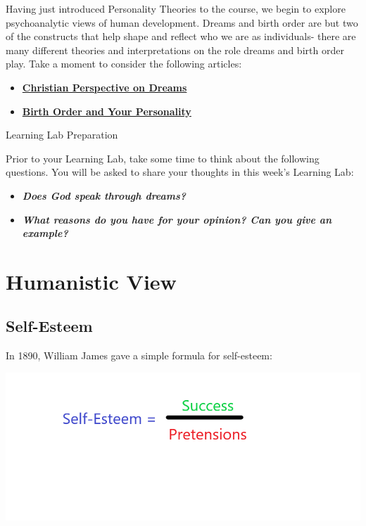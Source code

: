 \documentclass[
]{book}
\providecommand{\tightlist}{%
  \setlength{\itemsep}{0pt}\setlength{\parskip}{0pt}}
\begin{document}
\begin{reflect}
Having just introduced Personality Theories to the course, we begin to explore psychoanalytic views of human development. Dreams and birth order are but two of the constructs that help shape and reflect who we are as individuals- there are many different theories and interpretations on the role dreams and birth order play. Take a moment to consider the following articles:

\begin{itemize}
\tightlist
\item
  \href{https://www.cgg.org/index.cfm/fuseaction/Library.sr/CT/BQA/k/96/What-Is-Proper-Christian-Perspective-on-Dreams-Visions.htm}{\textbf{Christian Perspective on Dreams}}\\
\item
  \href{https://www.scientificamerican.com/article/ruled-by-birth-order/}{\textbf{Birth Order and Your Personality}}
\end{itemize}

{Learning Lab Preparation}

Prior to your Learning Lab, take some time to think about the following questions. You will be asked to share your thoughts in this week's Learning Lab:

\begin{itemize}
\tightlist
\item
  \textbf{\emph{Does God speak through dreams?}}\\
\item
  \textbf{\emph{What reasons do you have for your opinion? Can you give an example?}}
\end{itemize}
\end{reflect}

\hypertarget{humanistic-view}{%
\section{Humanistic View}\label{humanistic-view}}

\hypertarget{self-esteem}{%
\subsection*{Self-Esteem}\label{self-esteem}}

In 1890, William James gave a simple formula for self-esteem:

\includegraphics{assets/unit_5/Unit5_Topic2_Image.png}
\end{document}
